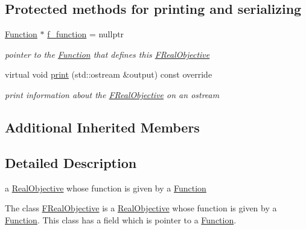 \subsection*{Protected methods for printing and serializing}
\begin{DoxyCompactItemize}
\item 
\mbox{\label{class_s_m_spp__di__unipi__it_1_1_f_real_objective_aad441c18d749a7928722b8418dbcb678}} 
\mbox{\hyperlink{class_s_m_spp__di__unipi__it_1_1_function}{Function}} $\ast$ \mbox{\hyperlink{class_s_m_spp__di__unipi__it_1_1_f_real_objective_aad441c18d749a7928722b8418dbcb678}{f\+\_\+function}} = nullptr
\begin{DoxyCompactList}\small\item\em pointer to the \mbox{\hyperlink{class_s_m_spp__di__unipi__it_1_1_function}{Function}} that defines this \mbox{\hyperlink{class_s_m_spp__di__unipi__it_1_1_f_real_objective}{F\+Real\+Objective}} \end{DoxyCompactList}\item 
virtual void \mbox{\hyperlink{class_s_m_spp__di__unipi__it_1_1_f_real_objective_a59a9fcbf8f9f86d348344b2073644b0e}{print}} (std\+::ostream \&output) const override
\begin{DoxyCompactList}\small\item\em print information about the \mbox{\hyperlink{class_s_m_spp__di__unipi__it_1_1_f_real_objective}{F\+Real\+Objective}} on an ostream \end{DoxyCompactList}\end{DoxyCompactItemize}
\subsection*{Additional Inherited Members}


\subsection{Detailed Description}
a \mbox{\hyperlink{class_s_m_spp__di__unipi__it_1_1_real_objective}{Real\+Objective}} whose function is given by a \mbox{\hyperlink{class_s_m_spp__di__unipi__it_1_1_function}{Function}} 

The class \mbox{\hyperlink{class_s_m_spp__di__unipi__it_1_1_f_real_objective}{F\+Real\+Objective}} is a \mbox{\hyperlink{class_s_m_spp__di__unipi__it_1_1_real_objective}{Real\+Objective}} whose function is given by a \mbox{\hyperlink{class_s_m_spp__di__unipi__it_1_1_function}{Function}}. This class has a field which is pointer to a \mbox{\hyperlink{class_s_m_spp__di__unipi__it_1_1_function}{Function}}. 

